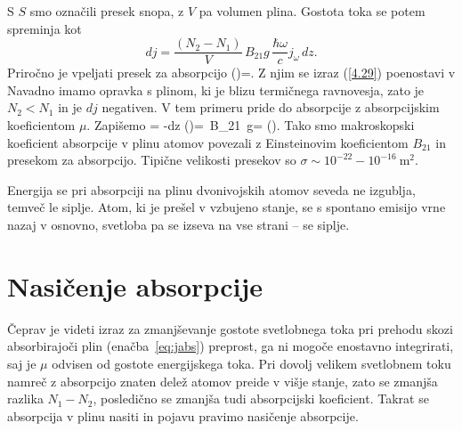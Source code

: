 S $S$ smo označili presek snopa, z $V$ pa volumen plina. Gostota 
toka se potem spreminja kot
\begin{equation}
dj=\frac{(N_{2}-N_{1})}{V}\, B_{21}g\, \frac{\hbar\omega}{c}j_{\omega}\, dz.
\label{4.29}
\end{equation}
Priročno je vpeljati presek za absorpcijo 
\beq
\sigma(\omega)=.
\label{sigma}
\eeq
Z njim se izraz (\ref{4.29}) poenostavi v 
Navadno imamo opravka s plinom, ki je blizu termičnega ravnovesja,
zato je $N_{2}<N_{1}$ in je $dj$ negativen. V tem primeru pride do
absorpcije z absorpcijskim koeficientom
$\mu$. Zapišemo 
\beq
{} = -\mu dz \qquad {} \qquad 
\mu(\omega)=\, B_{21}\, g=
\sigma(\omega).
\label{eq:jabs}
\eeq
Tako smo makroskopski koeficient absorpcije v plinu atomov povezali
z Einsteinovim koeficientom $B_{21}$ in presekom za absorpcijo. 
Tipične velikosti presekov so $\sigma \sim 10^{-22}-10^{-16}~\si{\metre^2}$. 

\begin{remark}
Energija se pri absorpciji na plinu dvonivojskih atomov seveda
ne izgublja, temveč le siplje. Atom, ki je prešel v vzbujeno stanje, se s spontano 
emisijo vrne nazaj v osnovno, svetloba pa se izseva na vse strani -- se siplje. 
\end{remark}

\section{Nasičenje absorpcije}
\label{chap:NasAbs}
Čeprav je videti izraz za zmanjševanje 
gostote svetlobnega toka pri prehodu skozi absorbirajoči plin (enačba~\ref{eq:jabs}) 
preprost, ga ni mogoče enostavno integrirati, saj je $\mu$ odvisen od 
gostote energijskega toka. Pri dovolj velikem svetlobnem toku namreč z 
absorpcijo znaten delež atomov preide v višje stanje, zato se zmanjša razlika $N_{1}-N_{2}$,
posledično se zmanjša tudi absorpcijski koeficient. Takrat se absorpcija
v plinu nasiti in pojavu pravimo nasičenje absorpcije.


